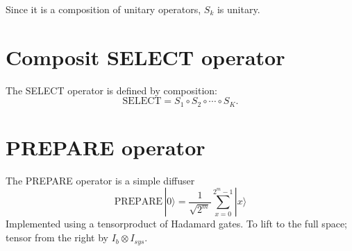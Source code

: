 \documentclass{article}
\begin{document}
Since it is a composition of unitary operators, $S_k$ is unitary.

\section*{Composit SELECT operator}

The SELECT operator is defined by composition:
\[
\boxed{
\mathrm{SELECT}
= S_1 \circ S_2 \circ \cdots \circ S_K.
}
\]
\section*{PREPARE operator}
The PREPARE operator is a simple diffuser
\[
\mathrm{PREPARE}\, |0\rangle
= \frac{1}{\sqrt{2^m}} \sum_{x=0}^{2^m-1} |x\rangle
\]
Implemented using a tensorproduct of Hadamard gates. To lift to the full space; tensor from the right by $I_b \otimes I_{sys}$.
\end{document}
